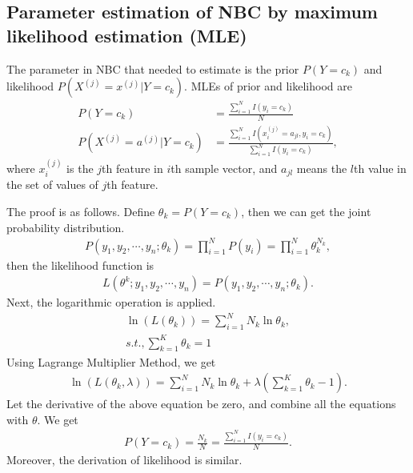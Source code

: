 \documentclass[10pt,onecolumn]{book}
\begin{document}
\subsection{Parameter estimation of NBC by maximum likelihood estimation (MLE)}
The parameter in NBC that needed to estimate is the prior $P(Y = c_k)$ and likelihood $P(X^{(j)} = x^{(j)} | Y = c_k)$.  
MLEs of prior and likelihood are
\begin{equation}
\begin{split}
P(Y = c_k) & = \frac{\sum_{i = 1}^N I(y_i = c_k)}{N} \\
P(X^{(j)} = a^{(j)} | Y = c_k) & = \frac{\sum_{i=1}^N I (x^{(j)}_i = a_{jl}, y_i = c_k)}{\sum_{i = 1}^N I(y_i = c_k)},
\end{split}
\end{equation}
where $x^{(j)}_i$ is the $j$th feature in $i$th sample vector, and $a_{jl}$ means the $l$th value in the set of values of $j$th feature.

The proof is as follows.
Define $\theta_k = P(Y = c_k)$, then we can get the joint probability distribution.
\begin{equation}
\begin{split}
P(y_1, y_2, \cdots, y_n; \theta_k) = \prod_{i=1}^N P(y_i) = \prod_{i=1}^N \theta_k^{N_k},
\end{split}
\end{equation}
then the likelihood function is 
\begin{equation}
\begin{split}
L(\theta^k; y_1, y_2, \cdots, y_n) = P(y_1, y_2, \cdots, y_n; \theta_k).
\end{split}
\end{equation}
Next, the logarithmic operation is applied.
\begin{equation}
\begin{split}
\ln(L(\theta_k)) = \sum_{i = 1}^N N_k \ln \theta_k, \\
s.t., \sum_{k = 1}^K \theta_k = 1
\end{split}
\end{equation}
Using Lagrange Multiplier Method, we get
\begin{equation}
\begin{split}
\ln(L(\theta_k, \lambda)) = \sum_{i = 1}^N N_k \ln \theta_k + \lambda(\sum_{k = 1}^K \theta_k - 1).
\end{split}
\end{equation}
Let the derivative of the above equation be zero, and combine all the equations with $\theta$. We get 
\begin{equation}
\begin{split}
P(Y=c_k) = \frac{N_k}{N} = \frac{\sum_{i = 1}^N I(y_i = c_k)}{N}.
\end{split}
\end{equation}
Moreover, the derivation of likelihood is similar.
\end{document}
